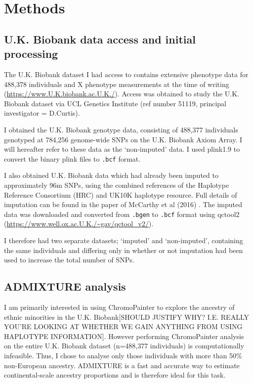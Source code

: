 

\section{Methods}

\subsection{U.K. Biobank data access and initial processing}

The U.K. Biobank dataset I had access to contains extensive phenotype data for 488,378 individuals and X phenotype measurements at the time of writing (\url{https://www.U.K.biobank.ac.U.K./}). Access was obtained to study the U.K. Biobank dataset via UCL Genetics Institute (ref number 51119, principal investigator = D.Curtis). 

I obtained the U.K. Biobank genotype data, consisting of 488,377 individuals genotyped at 784,256 genome-wide SNPs on the U.K. Biobank Axiom Array. I will hereafter refer to these data as the `non-imputed' data. I used plink1.9 \cite{purcell2007plink} to convert the binary plink files to \texttt{.bcf} format. 

I also obtained U.K. Biobank data which had already been imputed to approximately 96m SNPs, using the combined references of the Haplotype Reference Consortium (HRC) and UK10K haplotype resource. Full details of imputation can be found in the paper of McCarthy et al (2016) \cite{mccarthy2016reference}. The imputed data was downloaded and converted from \texttt{.bgen} to \texttt{.bcf} format using qctool2 (\url{https://www.well.ox.ac.U.K./~gav/qctool_v2/}). 

I therefore had two separate datasets; `imputed' and `non-imputed', containing the same individuals and differing only in whether or not imputation had been used to increase the total number of SNPs.

\subsection{ADMIXTURE analysis}

I am primarily interested in using ChromoPainter \cite{Lawson2012} to explore the ancestry of ethnic minorities in the U.K. Biobank{\color{red}[SHOULD JUSTIFY WHY? I.E. REALLY YOU'RE LOOKING AT WHETHER WE GAIN ANYTHING FROM USING HAPLOTYPE INFORMATION]}. However performing ChromoPainter analysis on the entire U.K. Biobank dataset (n=488,377 individuals) is computationally infeasible. Thus, I chose to analyse only those individuals with more than 50\% non-European ancestry. ADMIXTURE is a fast and accurate way to estimate continental-scale ancestry proportions \cite{alexander2009fast} and is therefore ideal for this task. 

